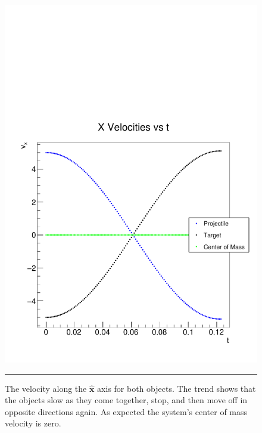 \documentclass[aps,prl,floatfix,preprint,nofootinbib]{revtex4}
\begin{document}
\begin{figure}[h!]
  \includegraphics[width=.45\textwidth]{plots/out_c6/vx_vs_t.pdf}
                  {\par\nobreak\rule[9pt]{35em}{0.5pt}\vspace{-5mm}}
                  \caption{The velocity along the $\hat{\mathbf{x}}$ axis for both objects. The trend shows that the objects slow as they come together, stop, and then move off in opposite directions again. As expected the system's center of mass velocity is zero.}
                  \label{fig:vx_c6}
\end{figure}
\end{document}
